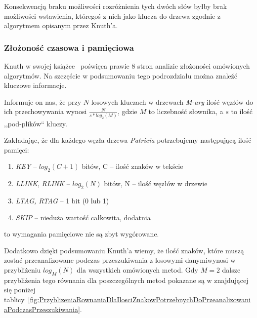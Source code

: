 	Konsekwencją braku możliwości rozróżnienia tych dwóch słów byłby brak możliwości wstawienia, któregoś z nich jako klucza do drzewa zgodnie z algorytmem opisanym przez Knuth'a.
	
	\subsubsection{Złożoność czasowa i pamięciowa}\label{sec:AlgorytmPZlozonoscCzasowaIPamieciowa}
	
	Knuth w swojej książce~\cite{KnuthsTheArtOfComputerProgramming3} poświęca prawie 8 stron analizie złożoności omówionych algorytmów. Na szczęście w podsumowaniu tego podrozdziału można znaleźć kluczowe informacje.
	
	Informuje on nas, że przy $N$ losowych kluczach w drzewach \emph{M-ary} ilość węzłów do ich przechowywania wynosi $\frac{N}{s*log_2(M)}$, gdzie $M$ to liczebność słownika, a $s$ to ilość ,,pod-plików`` kluczy\footnotemark[1].
	
	
	Zakładając, że dla każdego węzła drzewa \emph{Patricia} potrzebujemy następującą ilość pamięci:
	\begin{enumerate}
		\item \emph{KEY} -- $log_2(C+1)$ bitów, C -- ilość znaków w tekście
		\item \emph{LLINK}, \emph{RLINK} -- $log_2(N)$ bitów, N -- ilość węzłów w drzewie
		\item \emph{LTAG, RTAG} -- 1 bit (0 lub 1)
		\item \emph{SKIP} -- nieduża wartość całkowita, dodatnia
	\end{enumerate}
	to wymagania pamięciowe nie są zbyt wygórowane.
	
	Dodatkowo dzięki podsumowaniu Knuth'a wiemy, że ilość znaków, które muszą zostać przeanalizowane podczas przeszukiwania z losowymi danymi\footnotemark[1] wynosi w przybliżeniu $log_M(N)$ dla wszystkich omówionych metod. Gdy $M=2$ dalsze przybliżenia tego równania dla poszczególnych metod pokazane są w znajdującej się poniżej tablicy~\ref{fig:PrzyblizeniaRownaniaDlaIlosciZnakowPotrzebnychDoPrzeanalizowaniaPodczasPrzeszukiwania}.
	
	
